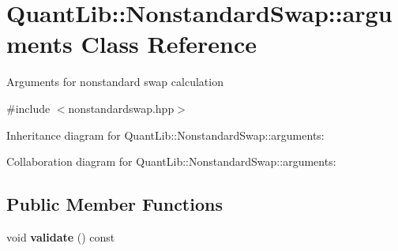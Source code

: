 \section{Quant\+Lib\+:\+:Nonstandard\+Swap\+:\+:arguments Class Reference}
\label{class_quant_lib_1_1_nonstandard_swap_1_1arguments}


Arguments for nonstandard swap calculation  




{\ttfamily \#include $<$nonstandardswap.\+hpp$>$}



Inheritance diagram for Quant\+Lib\+:\+:Nonstandard\+Swap\+:\+:arguments\+:


Collaboration diagram for Quant\+Lib\+:\+:Nonstandard\+Swap\+:\+:arguments\+:
\subsection*{Public Member Functions}
\begin{DoxyCompactItemize}
\item 
void {\bfseries validate} () const \label{class_quant_lib_1_1_nonstandard_swap_1_1arguments_a1b7a83596013d19976b40cfc9360869e}

\end{DoxyCompactItemize}
